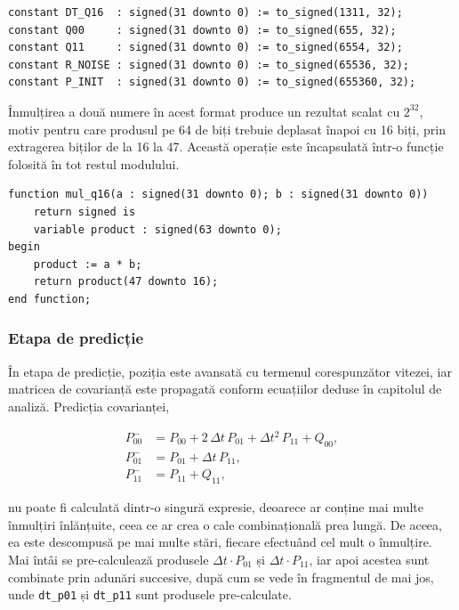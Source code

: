 \begin{lstlisting}[caption={Constantele filtrului, în format Q16.16.},label={lst:kalman-const}]
constant DT_Q16  : signed(31 downto 0) := to_signed(1311, 32);
constant Q00     : signed(31 downto 0) := to_signed(655, 32);
constant Q11     : signed(31 downto 0) := to_signed(6554, 32);
constant R_NOISE : signed(31 downto 0) := to_signed(65536, 32);
constant P_INIT  : signed(31 downto 0) := to_signed(655360, 32);
\end{lstlisting}

Înmulțirea a două numere în acest format produce un rezultat scalat cu $2^{32}$, motiv
pentru care produsul pe 64 de biți trebuie deplasat înapoi cu 16 biți, prin extragerea
biților de la 16 la 47. Această operație este încapsulată într-o funcție folosită în
tot restul modulului.

\begin{lstlisting}[caption={Funcția de înmulțire în virgulă fixă Q16.16.},label={lst:mulq16}]
function mul_q16(a : signed(31 downto 0); b : signed(31 downto 0))
    return signed is
    variable product : signed(63 downto 0);
begin
    product := a * b;
    return product(47 downto 16);
end function;
\end{lstlisting}

\subsubsection{Etapa de predicție}

În etapa de predicție, poziția este avansată cu termenul corespunzător vitezei, iar
matricea de covarianță este propagată conform ecuațiilor deduse în capitolul de
analiză. Predicția covarianței,

\begin{align*}
P_{00}^{-} &= P_{00} + 2\,\Delta t\,P_{01} + \Delta t^2\,P_{11} + Q_{00}, \\
P_{01}^{-} &= P_{01} + \Delta t\,P_{11}, \\
P_{11}^{-} &= P_{11} + Q_{11},
\end{align*}

nu poate fi calculată dintr-o singură expresie, deoarece ar conține mai multe
înmulțiri înlănțuite, ceea ce ar crea o cale combinațională prea lungă. De aceea, ea
este descompusă pe mai multe stări, fiecare efectuând cel mult o înmulțire. Mai întâi
se pre-calculează produsele $\Delta t \cdot P_{01}$ și $\Delta t \cdot P_{11}$, iar
apoi acestea sunt combinate prin adunări succesive, după cum se vede în fragmentul de
mai jos, unde \texttt{dt\_p01} și \texttt{dt\_p11} sunt produsele pre-calculate.

